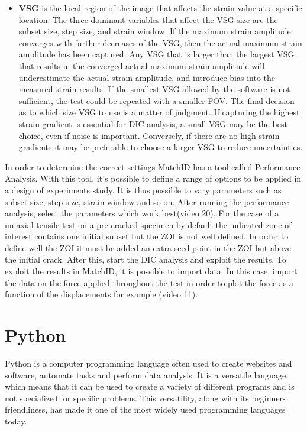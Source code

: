 \begin{itemize}
	\item \textbf{VSG} is the local region of the image that affects the strain value at a specific location. The three dominant variables that affect the VSG size are the subset size, step size, and strain window. If the maximum strain amplitude converges with further decreases of the VSG, then the actual maximum strain amplitude has been captured. Any VSG that is larger than the largest VSG that results in the converged actual maximum strain amplitude will underestimate the actual strain amplitude, and introduce bias into the measured strain results. If the smallest VSG allowed by the software is not sufficient, the test could be repeated with a smaller FOV. The final decision as to which size VSG to use is a matter of judgment. If capturing the highest strain gradient is essential for DIC analysis, a small VSG may be the best choice, even if noise is important. Conversely, if there are no high strain gradients it may be preferable to choose a larger VSG to reduce uncertainties.
\end{itemize}

In order to determine the correct settings MatchID has a tool called Performance Analysis. With this tool, it’s possible to define a range of options to be applied in a design of experiments study. It is thus possible to vary parameters such as subset size, step size, strain window and so on. After running the performance analysis, select the parameters which work best(video 20). 
For the case of a uniaxial tensile test on a pre-cracked specimen by default the indicated zone of interest contains one initial subset but the ZOI is not well defined. In order to define well the ZOI it must be added an extra seed point in the ZOI but above the initial crack. After this, start the DIC analysis and exploit the results. To exploit the results in MatchID, it is possible to import data. In this case, import the data on the force applied throughout the test in order to plot the force as a function of the displacements for example (video 11).



\section{Python}

Python is a computer programming language often used to create websites and software, automate tasks and perform data analysis. It is a versatile language, which means that it can be used to create a variety of different programs and is not specialized for specific problems. This versatility, along with its beginner-friendliness, has made it one of the most widely used programming languages today.

